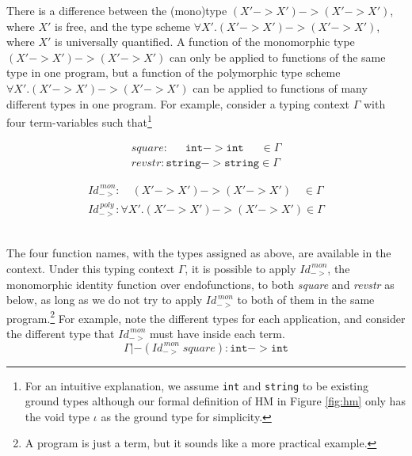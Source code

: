 There is a difference between the (mono)type $(X'-> X')-> (X'-> X')$,
where $X'$ is free, and the type scheme $\forall X'.(X'-> X')-> (X'-> X')$,
where $X'$ is universally quantified.
A function of the monomorphic type $(X'-> X')-> (X'-> X')$
can only be applied to functions of the same type in one program, but
a function of the polymorphic type scheme $\forall X'.(X'-> X')-> (X'-> X')$
can be applied to functions of many different types in one program.
For example, consider a typing context $\Gamma$ with four term-variables such that\footnote{
	For an intuitive explanation, we assume \texttt{int} and \texttt{string}
	to be existing ground types although our formal definition of HM
	in Figure \ref{fig:hm} only has the void type $\iota$ as
	the ground type for simplicity.} \vspace*{-1em}\\ 
\begin{minipage}{.3\linewidth}
\begin{align*}
\!\!\!\!\!\!\!\!\!\!
\textit{square} : \;\quad~\texttt{int} -> \texttt{int} ~\quad\; \in \Gamma \\
\!\!\!\!\!\!\!\!\!\!
\textit{revstr} : \texttt{string} -> \texttt{string} \in \Gamma
\end{align*}
\end{minipage}
\begin{minipage}{.4\linewidth}
\begin{align*}
\textit{Id}_{->}^{\,\textit{mon}} : \quad (X'-> X')-> (X'-> X') \quad \in \Gamma \\
\textit{Id}_{->}^{\,\textit{poly}} : \forall X'.(X'-> X')-> (X'-> X') \in \Gamma
\end{align*}
\end{minipage} \vspace*{1em} \\
The four function names, with the types assigned as above,
are available in the context. Under this typing context $\Gamma$,
it is possible to apply $\textit{Id}_{->}^{\,\textit{mon}}$,
the monomorphic identity function over endofunctions,
to both \textit{square} and \textit{revstr} as below,
as long as we do not try to apply $\textit{Id}_{->}^{\,\textit{mon}}$ to both
of them in the same program.\footnote{A program is just a term, but it sounds
like a more practical example.} For example, note the different types
for each application, and consider the different type that $\textit{Id}_{->}^{\,\textit{mon}}$
must have inside each term.
\[ \Gamma |-
	(\textit{Id}_{->}^{\,\textit{mon}}\;\textit{square}) :
	\texttt{int} -> \texttt{int}
\]
